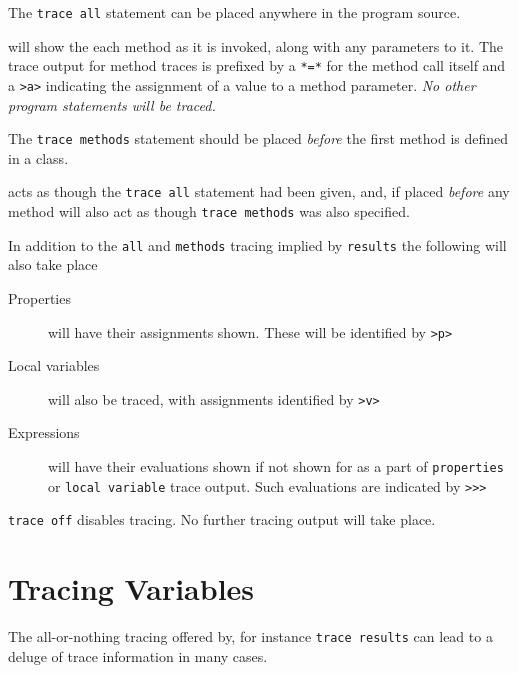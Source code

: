 {\begin{description}
The \texttt{trace all} statement can be placed anywhere in the program source. 

\item[\textbf{methods}] will show the each method as it is invoked, along with any parameters to it. The trace output for method traces is prefixed by a \texttt{*=*} for the method call itself and a \texttt{>a>} indicating the assignment of a value to a method parameter. \textit{No other program statements will be traced.}

The \texttt{trace methods} statement should be placed \textit{before} the first method is defined in a class.

\item[\textbf{results}] acts as though the \texttt{trace all} statement had been given, and, if placed \textit{before} any method will also act as though \texttt{trace methods} was also specified.

In addition to the \texttt{all} and \texttt{methods} tracing implied by \texttt{results} the following will also take place
\begin{description}

\item[Properties] will have their assignments shown. These will be identified by \texttt{>p>}

\item[Local variables] will also be traced, with assignments identified by \texttt{>v>}

\item[Expressions] will have their evaluations shown if not shown for as a part of \texttt{properties} or \texttt{local variable} trace output. Such evaluations are indicated by \texttt{>>>}
\end{description}
\item[\textbf{off}] \texttt{trace off} disables tracing. No further tracing output will take place.
\end{description} 

\section{Tracing Variables}
The all-or-nothing tracing offered by, for instance \texttt{trace results} can lead to a deluge of trace information in many cases.

}
